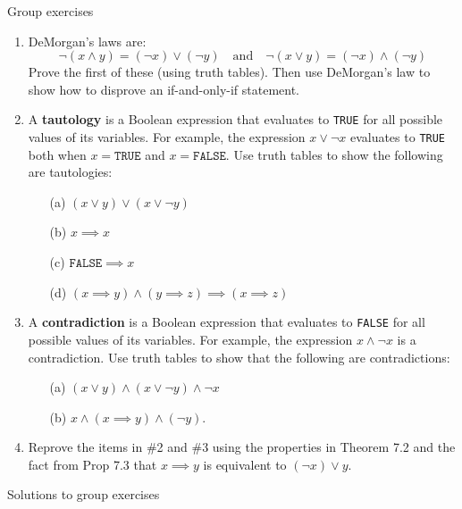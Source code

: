 \documentclass[10pt]{beamer}
\begin{document}
\begin{frame}{Group exercises}
\footnotesize 
\begin{enumerate}
	\item DeMorgan's laws are:
	\[ \lnot (x \land y) = (\lnot x) \lor (\lnot y) \quad \text{and} \quad \lnot (x \lor y) = (\lnot x) \land (\lnot y) \]
	Prove the first of these (using truth tables). Then use DeMorgan's law to show how to disprove an if-and-only-if statement.
	\item A \textbf{tautology} is a Boolean expression that evaluates to \texttt{TRUE} for all possible values of its variables.  For example, the expression $x \lor \lnot x$ evaluates to \texttt{TRUE}  both when $x=\texttt{TRUE}$ and $x=\texttt{FALSE}$.  Use truth tables to show the following are tautologies:
	    \vspace{-0.5cm}
		\begin{enumerate}
		\item[(a)] $(x \lor y) \lor (x \lor \lnot y)$
		\item[(b)] $x \implies x$
		\item[(c)] $\texttt{FALSE} \implies x$
		\item[(d)] $(x \implies y) \land (y \implies z) \implies (x \implies z)$ 
		\end{enumerate}
	\item  A \textbf{contradiction} is a Boolean expression that evaluates to \texttt{FALSE} for all possible values of its variables.  For example, the expression $x \land \lnot x$ is a contradiction.  Use truth tables to show that the following are contradictions:
		\begin{enumerate}
		\item[(a)] $(x \lor y) \land (x \lor \lnot y) \land \lnot x$
		\item[(b)] $x \land (x \implies y) \land (\lnot y)$.
		\end{enumerate}
	\item Reprove the items in \#2 and \#3 using the properties in Theorem 7.2 and the fact  from Prop 7.3 that $x \implies y$ is equivalent to $(\lnot x) \lor y$.
\end{enumerate}
\end{frame}

\begin{frame}[standout]
Solutions to group exercises	
\end{frame}
\end{document}
